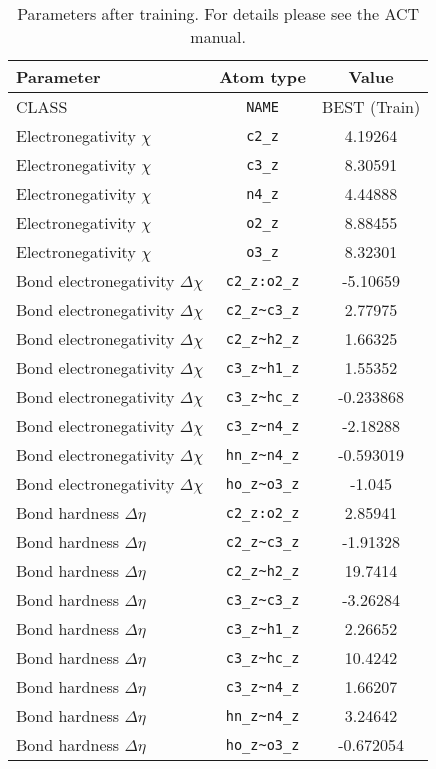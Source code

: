 \begin{table}[ht]
\caption{Parameters after training. For details please see the ACT manual.}
\begin{tabular}{lcc}
\hline
Parameter & Atom type & Value \\ 
\hline
CLASS & \verb^NAME^ & BEST (Train) \\ 
Electronegativity $\chi$ & \verb^c2_z^ & 4.19264 \\ 
Electronegativity $\chi$ & \verb^c3_z^ & 8.30591 \\ 
Electronegativity $\chi$ & \verb^n4_z^ & 4.44888 \\ 
Electronegativity $\chi$ & \verb^o2_z^ & 8.88455 \\ 
Electronegativity $\chi$ & \verb^o3_z^ & 8.32301 \\ 
Bond electronegativity $\Delta\chi$ & \verb^c2_z:o2_z^ & -5.10659 \\ 
Bond electronegativity $\Delta\chi$ & \verb^c2_z~c3_z^ & 2.77975 \\ 
Bond electronegativity $\Delta\chi$ & \verb^c2_z~h2_z^ & 1.66325 \\ 
Bond electronegativity $\Delta\chi$ & \verb^c3_z~h1_z^ & 1.55352 \\ 
Bond electronegativity $\Delta\chi$ & \verb^c3_z~hc_z^ & -0.233868 \\ 
Bond electronegativity $\Delta\chi$ & \verb^c3_z~n4_z^ & -2.18288 \\ 
Bond electronegativity $\Delta\chi$ & \verb^hn_z~n4_z^ & -0.593019 \\ 
Bond electronegativity $\Delta\chi$ & \verb^ho_z~o3_z^ & -1.045 \\ 
Bond hardness $\Delta\eta$ & \verb^c2_z:o2_z^ & 2.85941 \\ 
Bond hardness $\Delta\eta$ & \verb^c2_z~c3_z^ & -1.91328 \\ 
Bond hardness $\Delta\eta$ & \verb^c2_z~h2_z^ & 19.7414 \\ 
Bond hardness $\Delta\eta$ & \verb^c3_z~c3_z^ & -3.26284 \\ 
Bond hardness $\Delta\eta$ & \verb^c3_z~h1_z^ & 2.26652 \\ 
Bond hardness $\Delta\eta$ & \verb^c3_z~hc_z^ & 10.4242 \\ 
Bond hardness $\Delta\eta$ & \verb^c3_z~n4_z^ & 1.66207 \\ 
Bond hardness $\Delta\eta$ & \verb^hn_z~n4_z^ & 3.24642 \\ 
Bond hardness $\Delta\eta$ & \verb^ho_z~o3_z^ & -0.672054 \\ 

\end{tabular}
\end{table}
